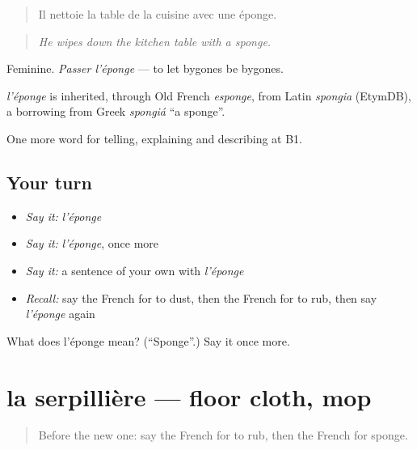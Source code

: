\begin{quote}
Il nettoie la table de la cuisine avec une éponge.
\end{quote}

\begin{quote}
\emph{He wipes down the kitchen table with a sponge.}
\end{quote}

Feminine. \emph{Passer l'éponge} — to let bygones be bygones.

\begin{cousinweb}
\emph{l'éponge} is inherited, through Old French \emph{esponge}, from Latin \emph{spongia} (EtymDB), a borrowing from Greek \emph{spongiá} \textquotedblleft{}a sponge\textquotedblright{}.
\end{cousinweb}

\begin{grammarlens}[title={What you've built}]
One more word for telling, explaining and describing at B1.
\end{grammarlens}

\subsection*{Your turn}
\begin{itemize}
\raggedright
  \item \emph{Say it:} \emph{l'éponge}
  \item \emph{Say it:} \emph{l'éponge}, once more
  \item \emph{Say it:} a sentence of your own with \emph{l'éponge}
  \item \emph{Recall:} say the French for to dust, then the French for to rub, then say \emph{l'éponge} again
\end{itemize}

\begin{tcolorbox}[breakable,colback=teal!4,colframe=teal!35!black,title={Before you move on}]
What does l'éponge mean? (\textquotedblleft{}Sponge\textquotedblright{}.) Say it once more.
\end{tcolorbox}
\section[la serpillière]{la serpillière — floor cloth, mop}

\label{lesson:FR-C528-serpilliere}



\begin{quote}
Before the new one: say the French for to rub, then the French for sponge.
\end{quote}

